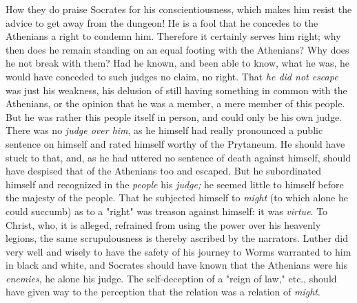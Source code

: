 \documentclass[a4paper]{book}
\begin{document}
How they do praise Socrates for his conscientiousness, which makes him resist 
the advice to get away from the dungeon! He is a fool that he concedes to the 
Athenians a right to condemn him. Therefore it certainly serves him right; why 
then does he remain standing on an equal footing with the Athenians? Why does 
he not break with them? Had he known, and been able to know, what he was, he 
would have conceded to such judges no claim, no right. That \textit{he did not 
escape} was just his weakness, his delusion of still having something in 
common with the Athenians, or the opinion that he was a member, a mere member 
of this people. But he was rather this people itself in person, and could only 
be his own judge. There was no \textit{judge over him}, as he himself had 
really pronounced a public sentence on himself and rated himself worthy of the 
Prytaneum. He should have stuck to that, and, as he had uttered no sentence of 
death against himself, should have despised that of the Athenians too and 
escaped. But he subordinated himself and recognized in the \textit{people} his 
\textit{judge;} he seemed little to himself before the majesty of the people. 
That he subjected himself to \textit{might} (to which alone he could succumb) 
as to a "{}right"{} was treason against himself: it was \textit{virtue}. To 
Christ, who, it is alleged, refrained from using the power over his heavenly 
legions, the same scrupulousness is thereby ascribed by the narrators. Luther 
did very well and wisely to have the safety of his journey to Worms warranted 
to him in black and white, and Socrates should have known that the Athenians 
were his \textit{enemies}, he alone his judge. The self-deception of a 
"{}reign of law,"{} etc., should have given way to the perception that the 
relation was a relation of \textit{might}.
\end{document}
